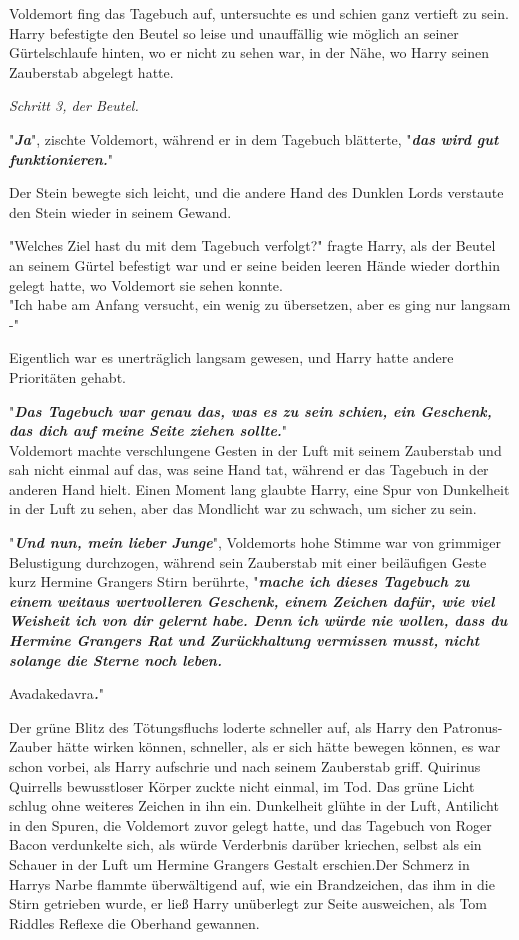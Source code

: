 {Voldemort fing das Tagebuch auf, untersuchte es und schien ganz vertieft zu sein. Harry befestigte den Beutel so leise und unauffällig wie möglich an seiner Gürtelschlaufe hinten, wo er nicht zu sehen war, in der Nähe, wo Harry seinen Zauberstab abgelegt hatte.

\emph{Schritt 3, der Beutel.}

"\textbf{\emph{Ja}}", zischte Voldemort, während er in dem Tagebuch blätterte, "\textbf{\emph{das wird gut funktionieren.}}"

Der Stein bewegte sich leicht, und die andere Hand des Dunklen Lords verstaute den Stein wieder in seinem Gewand.

"Welches Ziel hast du mit dem Tagebuch verfolgt?" fragte Harry, als der Beutel an seinem Gürtel befestigt war und er seine beiden leeren Hände wieder dorthin gelegt hatte, wo Voldemort sie sehen konnte.\\ "Ich habe am Anfang versucht, ein wenig zu übersetzen, aber es ging nur langsam -"

Eigentlich war es unerträglich langsam gewesen, und Harry hatte andere Prioritäten gehabt.

"\textbf{\emph{Das Tagebuch war genau das, was es zu sein schien, ein Geschenk, das dich auf meine Seite ziehen sollte.}}"\\ Voldemort machte verschlungene Gesten in der Luft mit seinem Zauberstab und sah nicht einmal auf das, was seine Hand tat, während er das Tagebuch in der anderen Hand hielt. Einen Moment lang glaubte Harry, eine Spur von Dunkelheit in der Luft zu sehen, aber das Mondlicht war zu schwach, um sicher zu sein.

"\textbf{\emph{Und nun, mein lieber Junge}}", Voldemorts hohe Stimme war von grimmiger Belustigung durchzogen, während sein Zauberstab mit einer beiläufigen Geste kurz Hermine Grangers Stirn berührte, "\textbf{\emph{mache ich dieses Tagebuch zu einem weitaus wertvolleren Geschenk, einem Zeichen dafür, wie viel Weisheit ich von dir gelernt habe. Denn ich würde nie wollen, dass du Hermine Grangers Rat und Zurückhaltung vermissen musst, nicht solange die Sterne noch leben.}}

Avadakedavra\textbf{\emph{.}}"

Der grüne Blitz des Tötungsfluchs loderte schneller auf, als Harry den Patronus-Zauber hätte wirken können, schneller, als er sich hätte bewegen können, es war schon vorbei, als Harry aufschrie und nach seinem Zauberstab griff. Quirinus Quirrells bewusstloser Körper zuckte nicht einmal, im Tod. Das grüne Licht schlug ohne weiteres Zeichen in ihn ein. Dunkelheit glühte in der Luft, Antilicht in den Spuren, die Voldemort zuvor gelegt hatte, und das Tagebuch von Roger Bacon verdunkelte sich, als würde Verderbnis darüber kriechen, selbst als ein Schauer in der Luft um Hermine Grangers Gestalt erschien.Der Schmerz in Harrys Narbe flammte überwältigend auf, wie ein Brandzeichen, das ihm in die Stirn getrieben wurde, er ließ Harry unüberlegt zur Seite ausweichen, als Tom Riddles Reflexe die Oberhand gewannen.

}

